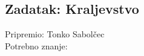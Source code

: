 \subsection*{Zadatak: Kraljevstvo}
\textsf{Pripremio: Tonko Sabolčec}\\
\textsf{Potrebno znanje: }\\
